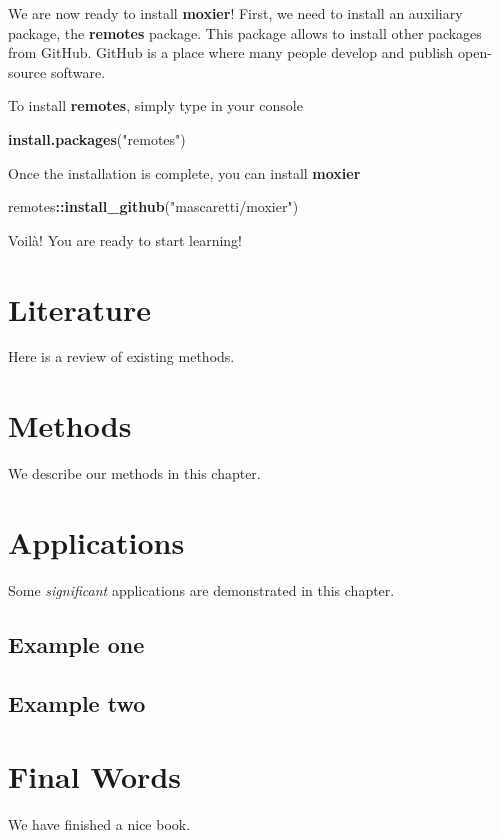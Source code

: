 \documentclass[]{book}
\newenvironment{Shaded}{\begin{snugshade}}{\end{snugshade}}
\newcommand{\KeywordTok}[1]{\textcolor[rgb]{0.13,0.29,0.53}{\textbf{#1}}}
\newcommand{\StringTok}[1]{\textcolor[rgb]{0.31,0.60,0.02}{#1}}
\newcommand{\OperatorTok}[1]{\textcolor[rgb]{0.81,0.36,0.00}{\textbf{#1}}}
\newcommand{\NormalTok}[1]{#1}
\begin{document}
We are now ready to install \textbf{moxier}! First, we need to install
an auxiliary package, the \textbf{remotes} package. This package allows
to install other packages from GitHub. GitHub is a place where many
people develop and publish open-source software.

To install \textbf{remotes}, simply type in your console

\begin{Shaded}
\begin{Highlighting}[]
\KeywordTok{install.packages}\NormalTok{(}\StringTok{"remotes"}\NormalTok{)}
\end{Highlighting}
\end{Shaded}

Once the installation is complete, you can install \textbf{moxier}

\begin{Shaded}
\begin{Highlighting}[]
\NormalTok{remotes}\OperatorTok{::}\KeywordTok{install_github}\NormalTok{(}\StringTok{"mascaretti/moxier"}\NormalTok{)}
\end{Highlighting}
\end{Shaded}

Voilà! You are ready to start learning!

\chapter{Literature}\label{literature}

Here is a review of existing methods.

\chapter{Methods}\label{methods}

We describe our methods in this chapter.

\chapter{Applications}\label{applications}

Some \emph{significant} applications are demonstrated in this chapter.

\section{Example one}\label{example-one}

\section{Example two}\label{example-two}

\chapter{Final Words}\label{final-words}

We have finished a nice book.


\end{document}
